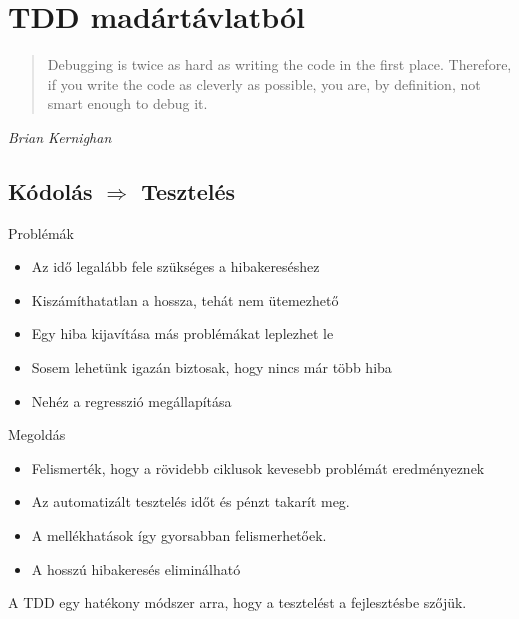 \section{TDD madártávlatból}

\begin{frame}{}
  \begin{quote}
    Debugging is twice as hard as writing the code in the first
    place. Therefore, if you write the code as cleverly as possible,
    you are, by definition, not smart enough to debug it.
  \end{quote}
\textit{Brian Kernighan}
\end{frame}

\subsection{Kódolás $\Rightarrow$ Tesztelés}

\begin{frame}{Problémák}
  \begin{itemize}[<+->]
  \item Az idő legalább fele szükséges a hibakereséshez
  \item Kiszámíthatatlan a hossza, tehát nem ütemezhető
  \item Egy hiba kijavítása más problémákat leplezhet le
  \item Sosem lehetünk igazán biztosak, hogy nincs már több hiba
  \item Nehéz a regresszió megállapítása
  \end{itemize}
\end{frame}

\begin{frame}{Megoldás}
  \begin{itemize}[<+->]
  \item Felismerték, hogy a rövidebb ciklusok kevesebb problémát eredményeznek
  \item Az automatizált tesztelés időt és pénzt takarít meg.
  \item A mellékhatások így gyorsabban felismerhetőek.
  \item A hosszú hibakeresés eliminálható
  \end{itemize}

  \pause
  A TDD egy hatékony módszer arra, hogy a tesztelést a fejlesztésbe szőjük.
\end{frame}
